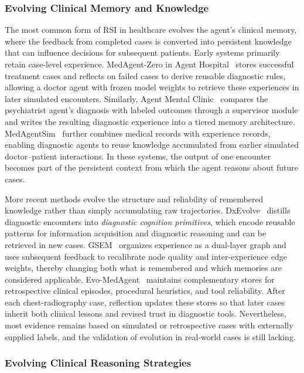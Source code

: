 \subsubsection{Evolving Clinical Memory and Knowledge}

The most common form of RSI in healthcare evolves the agent's clinical memory, where the feedback from completed cases is converted into persistent knowledge that can influence decisions for subsequent patients. 
Early systems primarily retain case-level experience. MedAgent-Zero in Agent Hospital~\cite{li2024agenthospital} stores successful treatment cases and reflects on failed cases to derive reusable diagnostic rules, allowing a doctor agent with frozen model weights to retrieve these experiences in later simulated encounters. 
Similarly, Agent Mental Clinic~\cite{lan2024agentmentalclinic} compares the psychiatrist agent's diagnosis with labeled outcomes through a supervisor module and writes the resulting diagnostic experience into a tiered memory architecture. 
MedAgentSim~\cite{almansoori2025medagentsim} further combines medical records with experience records, enabling diagnostic agents to reuse knowledge accumulated from earlier simulated doctor--patient interactions. 
In these systems, the output of one encounter becomes part of the persistent context from which the agent reasons about future cases.

More recent methods evolve the structure and reliability of remembered knowledge rather than simply accumulating raw trajectories. DxEvolve~\cite{ren2026dxevolve} distills diagnostic encounters into \emph{diagnostic cognition primitives}, which encode reusable patterns for information acquisition and diagnostic reasoning and can be retrieved in new cases. GSEM~\cite{han2026gsem} organizes experience as a dual-layer graph and uses subsequent feedback to recalibrate node quality and inter-experience edge weights, thereby changing both what is remembered and which memories are considered applicable. Evo-MedAgent~\cite{shen2026evomedagent} maintains complementary stores for retrospective clinical episodes, procedural heuristics, and tool reliability. After each chest-radiography case, reflection updates these stores so that later cases inherit both clinical lessons and revised trust in diagnostic tools. 
Nevertheless, most evidence remains based on simulated or retrospective cases with externally supplied labels, and the validation of evolution in real‑world cases is still lacking.

\subsubsection{Evolving Clinical Reasoning Strategies}

